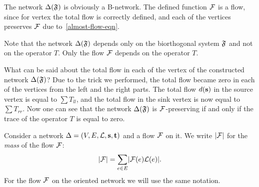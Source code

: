 \documentclass[12pt,oneside,a4paper]{amsart}
\begin{document}
      The network $\Delta(\mathfrak{F})$ is obviously a B-network.
      The defined function $\mathcal{F}$ is a flow, since for vertex the total flow is correctly defined,
        and each of the vertices preserves $\mathcal{F}$ due to~\eqref{almost-flow-eqn}.
      \begin{remark}
        Note that the network $\Delta(\mathfrak{F})$ depends only on the biorthogonal system $\mathfrak{F}$ and not on the operator $T$.
        Only the flow $\mathcal{F}$ depends on the operator $T$.
      \end{remark}
      What can be said about the total flow in each of the vertex of the constructed network $\Delta(\mathfrak{F})$?
      Due to the trick we performed, the total flow became zero in each of the vertices from the left and the right parts.
      The total flow $d(\mathbf{s})$ in the source vertex is equal to $\sum T_{ll}$, and the total flow in the
        sink vertex is now equal to $\sum T_{rr}$.
      Now one can see that the network $\Delta(\mathfrak{F})$ is $\mathcal{F}$-preserving if and only if the trace of the operator $T$ is equal to zero.
      \begin{definition}
        Consider a network $\Delta = (V, E, \mathcal{L}, \mathbf{s}, \mathbf{t})$ and a flow $\mathcal{F}$ on it.
        We write $\lvert\mathcal{F}\rvert$ for the \emph{mass} of the flow $\mathcal{F}$:
        \[
          \lvert\mathcal{F}\rvert = \sum_{e \in E} \lvert\mathcal{F}(e) \mathcal{L}(e)\rvert.
        \]
        For the flow $\mathcal{F}$ on the oriented network we will use the same notation.
      \end{definition}
\end{document}
